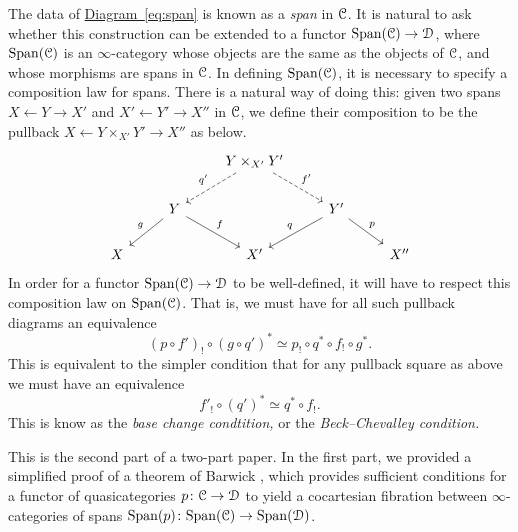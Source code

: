 \documentclass[main.tex]{subfiles}
\begin{document}
The data of \hyperref[eq:span]{Diagram~\ref*{eq:span}} is known as a \emph{span} in $\mathcal{C}$. It is natural to ask whether this construction can be extended to a functor $\mathrm{Span}(\mathcal{C}) \to \mathcal{D}$, where $\mathrm{Span}(\mathcal{C})$ is an $\infty$-category whose objects are the same as the objects of $\mathcal{C}$, and whose morphisms are spans in $\mathcal{C}$. In defining $\mathrm{Span}(\mathcal{C})$, it is necessary to specify a composition law for spans. There is a natural way of doing this: given two spans $X \leftarrow Y \rightarrow X'$ and $X' \leftarrow Y' \rightarrow X''$ in $\mathcal{C}$, we define their composition to be the pullback $X \leftarrow Y \times_{X'} Y' \rightarrow X''$ as below.
\begin{equation*}
  \begin{tikzcd}
    && Y \times_{X'} Y'
    \arrow[dl, dashed, swap, "q'"]
    \arrow[dr, dashed, "f'"]
    \\
    & Y
    \arrow[dl, swap, "g"]
    \arrow[dr, "f"]
    && Y'
    \arrow[dl, swap, "q"]
    \arrow[dr, "p"]
    \\
    X
    && X'
    && X''
  \end{tikzcd}
\end{equation*}
In order for a functor $\mathrm{Span}(\mathcal{C}) \to \mathcal{D}$ to be well-defined, it will have to respect this composition law on $\mathrm{Span}(\mathcal{C})$. That is, we must have for all such pullback diagrams an equivalence
\begin{equation*}
  (p \circ f')_{!} \circ (g \circ q')^{*} \simeq p_{!} \circ q^{*} \circ f_{!} \circ g^{*}.
\end{equation*}
This is equivalent to the simpler condition that for any pullback square as above we must have an equivalence
\begin{equation*}
  f'_{!} \circ (q')^{*} \simeq q^{*} \circ f_{!}.
\end{equation*}
This is know as the \emph{base change condtition,} or the \emph{Beck--Chevalley condition.}

This is the second part of a two-part paper. In the first part, we provided a simplified proof of a theorem of Barwick \cite[Thm.~12.2]{spectralmackeyfunctors1}, which provides sufficient conditions for a functor of quasicategories $p\colon \mathcal{C} \to \mathcal{D}$ to yield a cocartesian fibration between $\infty$-categories of spans $\mathrm{Span}(p)\colon \mathrm{Span}(\mathcal{C}) \to \mathrm{Span}(\mathcal{D})$. %
\end{document}
